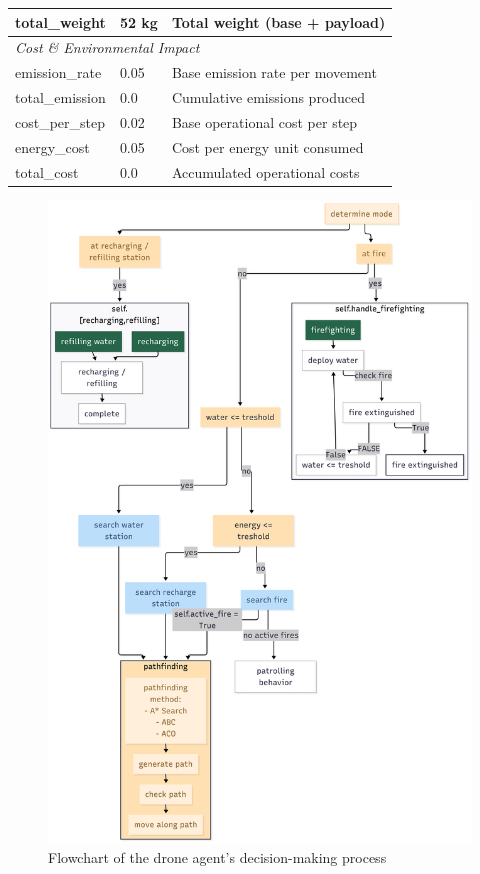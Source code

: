 \documentclass[11pt, a4paper]{article}
\begin{document}
\begin{table}[htbp]
\begin{tabular}{@{}lll@{}}
total\_weight & 52 kg & Total weight (base + payload) \\
\midrule
\multicolumn{3}{l}{\textit{Cost \& Environmental Impact}} \\
emission\_rate & 0.05 & Base emission rate per movement \\
total\_emission & 0.0 & Cumulative emissions produced \\
cost\_per\_step & 0.02 & Base operational cost per step \\
energy\_cost & 0.05 & Cost per energy unit consumed \\
total\_cost & 0.0 & Accumulated operational costs \\
\bottomrule
\end{tabular}
\end{table}

\begin{figure}[!htbp]
  \centering
  \includegraphics[width=1\textwidth]{figures/DroneAgent_Logic.png}
  \caption{Flowchart of the drone agent’s decision-making process}
  \label{fig:droneAgentlogic}
\end{figure}
\end{document}
